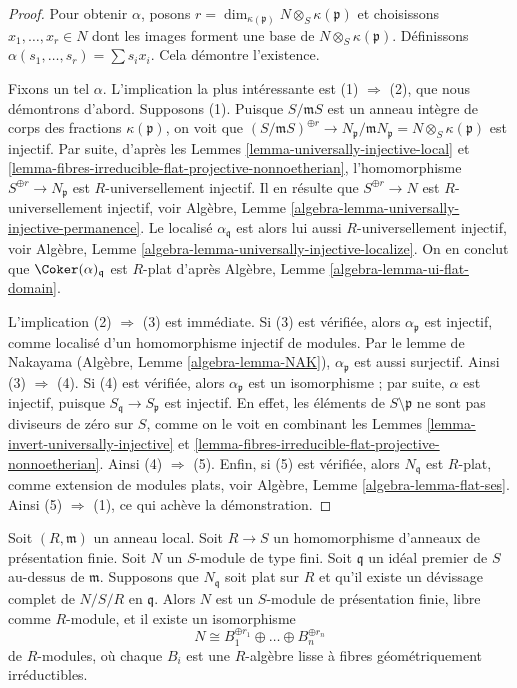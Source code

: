 \begin{proof}
Pour obtenir $\alpha$, posons
$r = \dim_{\kappa(\mathfrak p)} N \otimes_S \kappa(\mathfrak p)$ et choisissons
$x_1, \ldots, x_r \in N$ dont les images forment une base de\newline
$N \otimes_S \kappa(\mathfrak p)$. Définissons
$\alpha(s_1, \ldots, s_r) = \sum s_i x_i$. Cela démontre l'existence.

\medskip\noindent
Fixons un tel $\alpha$. L'implication la plus intéressante est
(1) $\Rightarrow$ (2), que nous démontrons d'abord. Supposons (1).
Puisque $S/\mathfrak mS$ est un anneau intègre de corps des fractions $\kappa(\mathfrak p)$,
on voit que
$(S/\mathfrak mS)^{\oplus r} \to
N_{\mathfrak p}/\mathfrak mN_{\mathfrak p} = N \otimes_S \kappa(\mathfrak p)$
est injectif. Par suite, d'après les
Lemmes \ref{lemma-universally-injective-local} et
\ref{lemma-fibres-irreducible-flat-projective-nonnoetherian},
l'homomorphisme $S^{\oplus r} \to N_{\mathfrak p}$ est $R$-universellement injectif.
Il en résulte que $S^{\oplus r} \to N$ est $R$-universellement injectif, voir
Algèbre, Lemme \ref{algebra-lemma-universally-injective-permanence}.
Le localisé $\alpha_{\mathfrak q}$ est alors lui aussi $R$-universellement
injectif, voir
Algèbre, Lemme \ref{algebra-lemma-universally-injective-localize}.
On en conclut que $\Coker(\alpha)_{\mathfrak q}$ est $R$-plat d'après
Algèbre, Lemme \ref{algebra-lemma-ui-flat-domain}.

\medskip\noindent
L'implication (2) $\Rightarrow$ (3) est immédiate. Si (3) est vérifiée, alors
$\alpha_{\mathfrak p}$ est injectif, comme localisé d'un homomorphisme injectif
de modules. Par le lemme de Nakayama
(Algèbre, Lemme \ref{algebra-lemma-NAK}),
$\alpha_{\mathfrak p}$ est aussi surjectif. Ainsi (3) $\Rightarrow$ (4).
Si (4) est vérifiée, alors $\alpha_{\mathfrak p}$ est un isomorphisme ; par suite,
$\alpha$ est injectif, puisque $S_{\mathfrak q} \to S_{\mathfrak p}$ est injectif.
En effet, les éléments de $S \setminus \mathfrak p$ ne sont pas diviseurs de zéro sur $S$,
comme on le voit en combinant les
Lemmes \ref{lemma-invert-universally-injective} et
\ref{lemma-fibres-irreducible-flat-projective-nonnoetherian}.
Ainsi (4) $\Rightarrow$ (5). Enfin, si (5) est vérifiée, alors
$N_{\mathfrak q}$ est $R$-plat, comme extension de modules plats, voir
Algèbre, Lemme \ref{algebra-lemma-flat-ses}.
Ainsi (5) $\Rightarrow$ (1), ce qui achève la démonstration.
\end{proof}

\begin{lemma}
\label{lemma-complete-devissage-flat-finite-type-module}
Soit $(R, \mathfrak m)$ un anneau local.
Soit $R \to S$ un homomorphisme d'anneaux de présentation finie.
Soit $N$ un $S$-module de type fini.
Soit $\mathfrak q$ un idéal premier de $S$ au-dessus de $\mathfrak m$.
Supposons que $N_{\mathfrak q}$ soit plat sur $R$ et
qu'il existe un d\'evissage complet de $N/S/R$ en $\mathfrak q$.
Alors $N$ est un $S$-module de présentation finie, libre comme $R$-module,
et il existe un isomorphisme
$$
N \cong B_1^{\oplus r_1} \oplus \ldots \oplus B_n^{\oplus r_n}
$$
de $R$-modules, où chaque $B_i$ est une $R$-algèbre lisse à fibres géométriquement
irréductibles.
\end{lemma}

